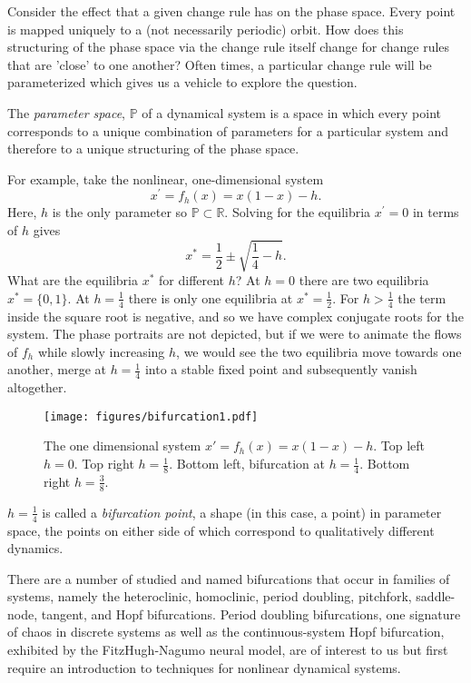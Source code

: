 \documentclass{elsart}
\begin{document}
Consider the effect that a given change rule has on the phase space.  Every
point is mapped uniquely to a (not necessarily periodic) orbit.  How does this
structuring of the phase space via the change rule itself change for change
rules that are 'close' to one another?  Often times, a particular change
rule will be parameterized which gives us a vehicle to explore the question.

The \textit{parameter space}, $\mathbb{P}$ of a dynamical system is a space in
which every point corresponds to a unique combination of parameters for a
particular system and therefore to a unique structuring of the phase space.

For example, take the nonlinear, one-dimensional system 
$$x^{\prime} = f_{h}(x) = x(1-x)-h.$$  Here, $h$
is the only parameter so $\mathbb{P} \subset \mathbb{R}$.  Solving for the
equilibria $x^{\prime} = 0$ in terms of $h$ gives $$x^{*}=\frac{1}{2} \pm \sqrt{\frac{1}{4} - h}.$$
What are the equilibria $x^{*}$ for different $h$?  At $h=0$ there are two equilibria $x^{*}=\{0,1\}$.  At $h=\frac{1}{4}$ there is only one equilibria at $x^{*}=\frac{1}{2}$.  For 
$h > \frac{1}{4}$ the term inside the square root is negative, and so we have complex conjugate roots for the system.  The phase portraits are not depicted, but if we were to animate the flows of $f_{h}$ while slowly increasing $h$, we would see the two equilibria move towards one another, merge at $h=\frac{1}{4}$ into a stable fixed point and subsequently vanish altogether.


\begin{figure}[htp]
\centering
\texttt{[image: figures/bifurcation1.pdf]}
\caption{The one dimensional system $x\prime = f_{h}(x) = x(1-x)-h$.
Top left $h=0$.  Top right $h=\frac{1}{8}$.
Bottom left, bifurcation at $h=\frac{1}{4}$.
Bottom right $h=\frac{3}{8}$.} 
\label{fig:hopf}
\end{figure}


$h=\frac{1}{4}$ is called a \textit{bifurcation point}, a shape (in this case, a point) in parameter space, the points on either side of which correspond to qualitatively different dynamics.

There are a number of studied and named bifurcations that occur in families of systems, namely the heteroclinic, homoclinic, period doubling, pitchfork, saddle-node, tangent, and Hopf bifurcations.  Period doubling bifurcations, one signature of chaos in discrete systems as well as the continuous-system Hopf bifurcation, exhibited by the FitzHugh-Nagumo neural model, are of interest to us but 
first require an introduction to techniques for nonlinear dynamical systems.
\end{document}
